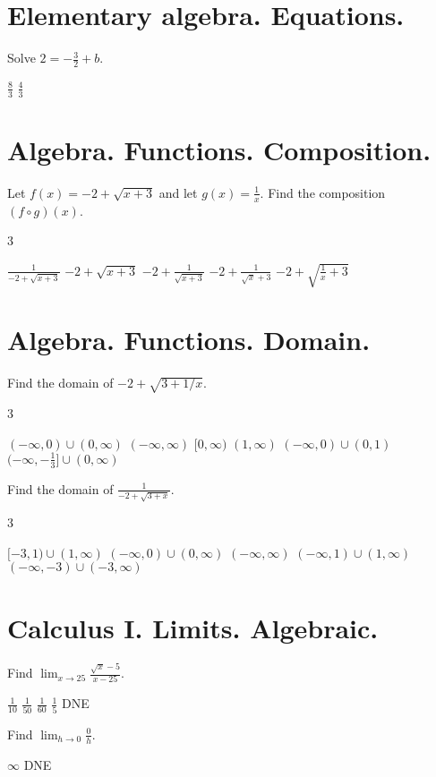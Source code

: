 \documentclass[addpoints]{exam}
\begin{document}
\begin{questions}
\section{Elementary algebra. Equations.}
\question Solve $2=-\frac32+b$. \qquad\qquad
\begin{oneparchoices}
	\correctchoice $\frac83$
	\choice $\frac43$
	\end{oneparchoices}

\section{Algebra. Functions. Composition.}
\question Let $f(x) = -2+\sqrt{x+3}$ and let $g(x) = \frac1x$. Find the composition $(f\circ g)(x)$.
\begin{multicols}3
\begin{choices}
	\choice $\frac1{-2+\sqrt{x+3}}$
	\choice $-2+\sqrt{x+3}$
	\choice $-2+\frac1{\sqrt{x+3}}$
	\choice $-2+\frac1{\sqrt x+3}$
	\correctchoice $-2+\sqrt{\frac1x+3}$
	\end{choices}
	\end{multicols}

\section{Algebra. Functions. Domain.}
\question Find the domain of $-2+\sqrt{3+1/x}$.
\begin{multicols}3
\begin{choices}
	\choice $(-\infty,0)\cup(0,\infty)$ %
	\choice $(-\infty,\infty)$ %
	\choice $[0,\infty)$ %
	\choice $(1,\infty)$ %
	\choice $(-\infty,0)\cup(0,1)$ %
	\correctchoice $(-\infty,-\tfrac13]\cup(0,\infty)$ %
	\end{choices}
	\end{multicols}
\question Find the domain of $\frac1{-2+\sqrt{3+x}}$.
\begin{multicols}3
\begin{choices}
	\correctchoice $[-3,1)\cup(1,\infty)$
	\choice $(-\infty,0)\cup(0,\infty)$
	\choice $(-\infty,\infty)$
	\choice $(-\infty,1)\cup(1,\infty)$
	\choice $(-\infty,-3)\cup(-3,\infty)$
	\end{choices}
	\end{multicols}

\section{Calculus I. Limits. Algebraic.}
\question Find $\lim_{x\to 25} \frac{\sqrt x-5}{x-25}$. \qquad\qquad
\begin{oneparchoices}
	\correctchoice $\frac1{10}$
	\choice $\frac1{50}$ %
	\choice $\frac1{60}$
	\choice $\frac15$
	\choice DNE
	\end{oneparchoices}
\question Find $\lim_{h\to0} \frac0h$. \qquad\qquad
\begin{oneparchoices}
	\choice $\infty$
	\choice DNE
	\end{oneparchoices}
\end{questions}
\end{document}
